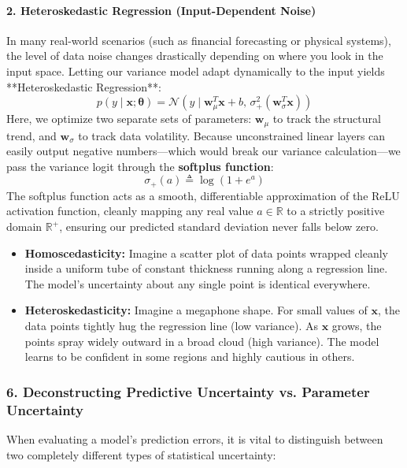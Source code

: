 \documentclass{article}
\begin{document}
\paragraph{2. Heteroskedastic Regression (Input-Dependent Noise)}
In many real-world scenarios (such as financial forecasting or physical systems), the level of data noise changes drastically depending on where you look in the input space. Letting our variance model adapt dynamically to the input yields **Heteroskedastic Regression**:
\begin{equation}
    p(y \mid \mathbf{x}; \boldsymbol{\theta}) = \mathcal{N}\left(y \mid \mathbf{w}_\mu^T\mathbf{x} + b, \, \sigma_+^2(\mathbf{w}_\sigma^T\mathbf{x})\right)
\end{equation}
Here, we optimize two separate sets of parameters: $\mathbf{w}_\mu$ to track the structural trend, and $\mathbf{w}_\sigma$ to track data volatility. Because unconstrained linear layers can easily output negative numbers—which would break our variance calculation—we pass the variance logit through the \textbf{softplus function}:
\begin{equation}
    \sigma_+(a) \triangleq \log(1 + e^a)
\end{equation}
The softplus function acts as a smooth, differentiable approximation of the ReLU activation function, cleanly mapping any real value $a \in \mathbb{R}$ to a strictly positive domain $\mathbb{R}^+$, ensuring our predicted standard deviation never falls below zero.

\begin{tcolorbox}[colback=blue!5!white, colframe=blue!60!black, title=Intuitive Visualization: Homoscedastic vs. Heteroskedastic]
\begin{itemize}
    \item \textbf{Homoscedasticity:} Imagine a scatter plot of data points wrapped cleanly inside a uniform tube of constant thickness running along a regression line. The model's uncertainty about any single point is identical everywhere.
    \item \textbf{Heteroskedasticity:} Imagine a megaphone shape. For small values of $\mathbf{x}$, the data points tightly hug the regression line (low variance). As $\mathbf{x}$ grows, the points spray widely outward in a broad cloud (high variance). The model learns to be confident in some regions and highly cautious in others.
\end{itemize}
\end{tcolorbox}

\subsubsection*{6. Deconstructing Predictive Uncertainty vs. Parameter Uncertainty}
When evaluating a model's prediction errors, it is vital to distinguish between two completely different types of statistical uncertainty:
\end{document}
